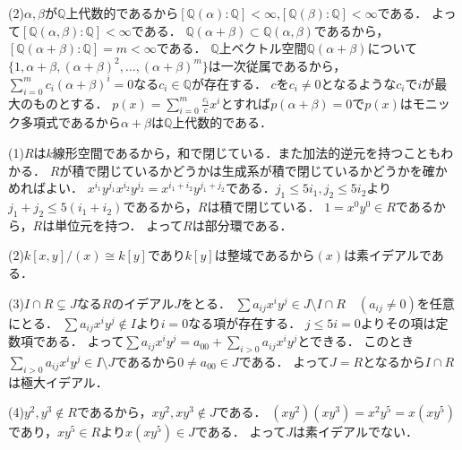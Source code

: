 \documentclass[
		book,
		head_space=20mm,
		foot_space=20mm,
		gutter=10mm,
		line_length=190mm
]{jlreq}
\begin{document}
(2)$\alpha,\beta$が$\mathbb{Q}$上代数的であるから$[\mathbb{Q}(\alpha):\mathbb{Q}]<\infty$,$[\mathbb{Q}(\beta):\mathbb{Q}]<\infty$である．
よって$[\mathbb{Q}(\alpha,\beta):\mathbb{Q}]<\infty$である．
$\mathbb{Q}(\alpha+\beta)\subset \mathbb{Q}(\alpha,\beta)$であるから，
$[\mathbb{Q}(\alpha+\beta):\mathbb{Q}]=m<\infty$である．
$\mathbb{Q}$上ベクトル空間$\mathbb{Q}(\alpha+\beta)$について$\{ 1,\alpha+\beta,(\alpha+\beta)^2,\ldots,(\alpha+\beta)^{m}\}$は一次従属であるから，$\sum\limits_{i=0}^m c_i(\alpha+\beta)^i=0$なる$c_i\in \mathbb{Q}$が存在する．
$c$を$c_i\neq 0$となるような$c_i$で$i$が最大のものとする．
$p(x)=\sum\limits_{i=0}^m \frac{c_i}{c}x^i$とすれば$p(\alpha+\beta)=0$で$p(x)$はモニック多項式であるから$\alpha+\beta$は$\mathbb{Q}$上代数的である．

(1)$R$は$k$線形空間であるから，和で閉じている．また加法的逆元を持つこともわかる．
$R$が積で閉じているかどうかは生成系が積で閉じているかどうかを確かめればよい．
$x^{i_1}y^{j_1} x^{i_2}y^{j_2}=x^{i_1+i_2}y^{j_1+j_2}$である．$j_1\le 5 i_1,j_2\le 5 i_2$より$j_1+j_2\le 5(i_1+i_2)$であるから，$R$は積で閉じている．
$1=x^0y^0\in R$であるから，$R$は単位元を持つ．
よって$R$は部分環である．

(2)$k[x,y]/(x)\cong k[y]$であり$k[y]$は整域であるから$(x)$は素イデアルである．

(3)$I\cap R\subsetneq J$なる$R$のイデアル$J$をとる．
$\sum a_{ij}x^iy^j \in J\setminus I\cap R\quad(a_{ij}\neq 0)$を任意にとる．
$\sum a_{ij}x^iy^j \notin I$より$i=0$なる項が存在する．
$j\le 5i=0$よりその項は定数項である．
よって$\sum a_{ij}x^iy^j= a_{00} +\sum\limits_{i> 0} a_{ij}x^iy^j$とできる．
このとき$\sum\limits_{i> 0} a_{ij}x^iy^j\in I\setminus J$であるから$0\neq a_{00}\in J$である．
よって$J=R$となるから$I\cap R$は極大イデアル．

(4)$y^2,y^3\notin R$であるから，$xy^2,xy^3\notin J$である．
$(xy^2)(xy^3)=x^2y^5=x(xy^5)$であり，$xy^5\in R$より$x(xy^5)\in J$である．
よって$J$は素イデアルでない．
\end{document}
